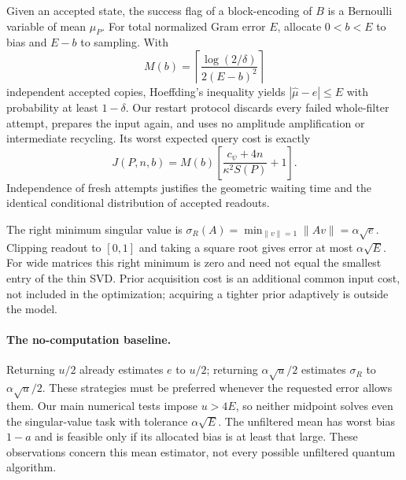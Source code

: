 \documentclass[11pt]{article}
\begin{document}
Given an accepted state, the success flag of a block-encoding of $B$ is a
Bernoulli variable of mean $\mu_P$. For total normalized Gram error $E$,
allocate $0<b<E$ to bias and $E-b$ to sampling. With
\begin{equation}\label{eq:shots}
 M(b)=\left\lceil\frac{\log(2/\delta)}{2(E-b)^2}\right\rceil
\end{equation}
independent accepted copies, Hoeffding's inequality yields
$|\widehat\mu-e|\leq E$ with probability at least $1-\delta$.
Our restart protocol discards every failed whole-filter attempt, prepares
the input again, and uses no amplitude amplification or intermediate
recycling. Its worst expected query cost is exactly
\begin{equation}\label{eq:cost}
 J(P,n,b)=M(b)\left[\frac{c_\psi+4n}{\kappa^2 S(P)}+1\right].
\end{equation}
Independence of fresh attempts justifies the geometric waiting time and
the identical conditional distribution of accepted readouts.

The right minimum singular value is
$\sigma_R(A)=\min_{\|v\|=1}\|Av\|=\alpha\sqrt e$. Clipping readout to
$[0,1]$ and taking a square root gives error at most $\alpha\sqrt E$.
For wide matrices this right minimum is zero and need not equal the
smallest entry of the thin SVD. Prior acquisition cost is an additional
common input cost, not included in the optimization; acquiring a tighter
prior adaptively is outside the model.

\paragraph{The no-computation baseline.}
Returning $u/2$ already estimates $e$ to $u/2$; returning
$\alpha\sqrt u/2$ estimates $\sigma_R$ to $\alpha\sqrt u/2$.
These strategies must be preferred whenever the requested error allows
them. Our main numerical tests impose $u>4E$, so neither midpoint solves
even the singular-value task with tolerance $\alpha\sqrt E$.
The unfiltered mean has worst bias $1-a$ and is feasible only if its
allocated bias is at least that large. These observations concern this
mean estimator, not every possible unfiltered quantum algorithm.
\end{document}
